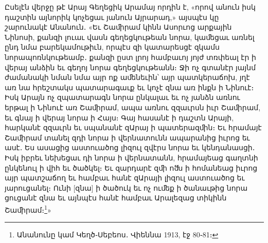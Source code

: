 \documentclass{article}
\begin{document}
{Ըսելէն վերջը թէ Արայ Գեղեցիկ Արամայ որդին է, «որով անուն իսկ դաշտին այնորիկ կոչեցաւ յանուն Այրարադ,» այսպէս կը շարունակէ Անանուն․ «Եւ Շաﬕրամ կինն Ասորւոց արքային Նինոսի, քանզի լուաւ վասն գեղեցկութեան նորա, կաﬔցաւ առնել ընդ նմա բարեկամութիւն, որպէս զի կատարեսցէ զկամս նորապոռնկութեամբ․ քանզի ըստ լրոյ համբաւոյ յոյժ տռփեալ էր ի վերայ անձին եւ գեղոյ նորա գեղեցկութեանն։ Ջի ոչ գտանէր յայնմ ժամանակի նման նմա այր ոք աﬔնեւին՝ այր պատկերաճոխ, յղէ առ նա հրեշտակս պատարագաւք եւ կոչէ զնա առ ինքն ի Նինուէ։ Իսկ Արայն ոչ զպատարագն նորա ընկալաւ եւ ոչ յանձն առնու երթալ ի Նինուէ առ Շաﬕրամ, ապա առնու զզաւրսն իւր Շաﬕրամ, եւ գնայ ի վերայ նորա ի Հայս։ Գայ հասանէ ի դաշտն Արայի, հարկանէ զզաւրն եւ սպանանէ զԱրայ ի պատերազﬕն։ Եւ հրամայէ Շաﬕրամ տանել զդի նորա ի վերնատունն ապարանից իւրոց եւ ասէ․ Ես ասացից աստուածոց լիզուլ զվէրս նորա եւ կենդանասցի․ Իսկ իբրեւ նեխեցաւ դի նորա ի վերնատանն, հրամայեաց գաղտնի ընկենուլ ի վիհ եւ ծածկել։ Եւ զարդարէ զﬕ ոﬓ ի հոմանեաց իւրոց այր պատշաճող եւ համբաւ հանէ զԱրայի լիզուլ աստուածոց եւ յարուցանել։ Ունի [զնա] ի ծածուկ եւ ոչ ուﬔք ի ծանաւթից նորա ցուցանէ զնա եւ այնպէս հանէ համբաւ Արալեզաց տիկինն Շաﬕրամ։\footnote{Անանունը կամ Կեղծ֊Սեբեոս․ Վիեննա 1913, էջ 80֊81։}»

}
\end{document}

